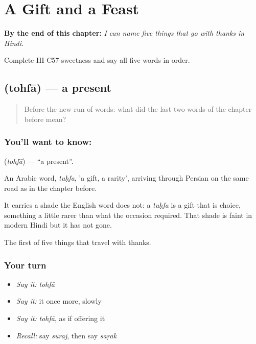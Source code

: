 
\chapter{A Gift and a Feast}
\label{ch:hi-a-gift-and-a-feast}

\begin{chapteropening}
\textbf{By the end of this chapter:} \emph{I can name five things that go with thanks in Hindi.}

Complete HI-C57-sweetness and say all five words in order.
\end{chapteropening}

\section[\texorpdfstring{\hi{तोहफ़ा} (tohfā)}{तोहफ़ा (tohfā)}]{ (tohfā) — a present}

\label{lesson:HI-C57-present}



\begin{quote}
Before the new run of words: what did the last two words of the chapter before mean?
\end{quote}

\subsection*{You'll want to know: }
\textbf{} (\emph{tohfā}) — \textquotedblleft{}a present\textquotedblright{}.

An Arabic word, \emph{tuḥfa}, 'a gift, a rarity', arriving through Persian on the same road as  in the chapter before.

It carries a shade the English word does not: a \emph{tuḥfa} is a gift that is choice, something a little rarer than what the occasion required. That shade is faint in modern Hindi but it has not gone.

\begin{grammarlens}[title={What you've built}]
The first of five things that travel with thanks.
\end{grammarlens}

\subsection*{Your turn}
\begin{itemize}
\raggedright
  \item \emph{Say it:} \emph{tohfā}
  \item \emph{Say it:} it once more, slowly
  \item \emph{Say it:} \emph{tohfā}, as if offering it
  \item \emph{Recall:} say \emph{sūraj}, then say \emph{saṛak}
\end{itemize}

